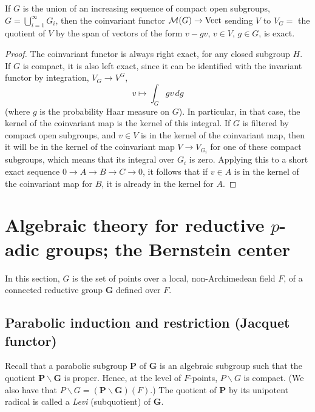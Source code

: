 \begin{lemma}
	\label{lemma-compact-coinvariants}	
	If $G$ is the union of an increasing sequence of compact open subgroups, $G = \bigcup_{i=1}^\infty G_i$, then the coinvariant functor $\mathcal M(G)\to \rm{Vect}$ sending $V$ to $V_G=$ the quotient of $V$ by the span of vectors of the form $v-gv$, $v\in V$, $g\in G$, is exact.
\end{lemma}

\begin{proof}
	The coinvariant functor is always right exact, for any closed subgroup $H$. If $G$ is compact, it is also left exact, since it can be identified with the invariant functor by integration, $V_G\to V^G$, 
	$$v\mapsto \int_G gv \, dg$$
	(where $g$ is the probability Haar measure on $G$). In particular, in that case, the kernel of the coinvariant map is the kernel of this integral. If $G$ is filtered by compact open subgroups, and $v\in V$ is in the kernel of the coinvariant map, then it will be in the kernel of the coinvariant map $V\to V_{G_i}$ for one of these compact subgroups, which means that its integral over $G_i$ is zero. Applying this to a short exact sequence $0\to A\to B\to C\to 0$, it follows that if $v\in A$ is in the kernel of the coinvariant map for $B$, it is already in the kernel for $A$.
\end{proof}

\section{Algebraic theory for reductive $p$-adic groups; the Bernstein center}
\label{section-padic-reductive}

In this section, $G$ is the set of points over a local, non-Archimedean field $F$, of a connected reductive group $\mathbf G$ defined over $F$. 

\subsection{Parabolic induction and restriction (Jacquet functor)}
\label{subsection-parabolic-induction-restriction}

Recall that a parabolic subgroup $\mathbf P$ of $\mathbf G$ is an algebraic subgroup such that the quotient $\mathbf P\backslash\mathbf G$ is proper. Hence, at the level of $F$-points, $P\backslash G$ is compact. (We also have that $P\backslash G = (\mathbf P\backslash\mathbf G)(F)$.) The quotient of $\mathbf P$ by its unipotent radical is called a \emph{Levi} (subquotient) of $\mathbf G$. 


